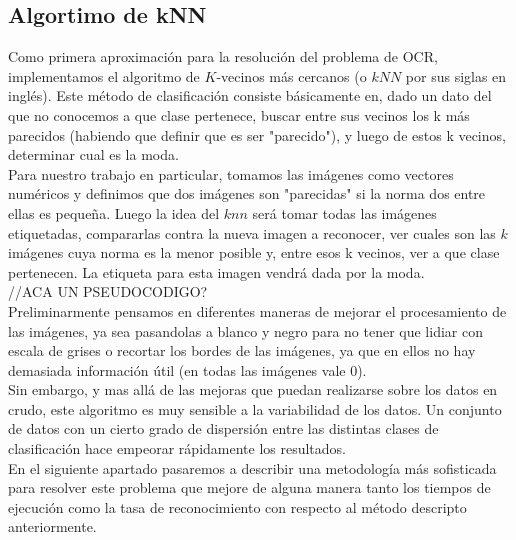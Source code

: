 \subsection{Algortimo de kNN}
Como primera aproximación para la resolución del problema de OCR, implementamos el algoritmo de $K$-vecinos más cercanos (o $kNN$ por sus siglas en inglés). Este método de clasificación consiste básicamente en, dado un dato del que no conocemos a que clase pertenece, buscar entre sus vecinos los k más parecidos (habiendo que definir que es ser "parecido"), y luego de estos k vecinos, determinar cual es la moda. 
\\
Para nuestro trabajo en particular, tomamos las imágenes como vectores numéricos y definimos que dos imágenes son "parecidas" si la norma dos entre ellas es pequeña. Luego la idea del $knn$ será tomar todas las imágenes etiquetadas, compararlas contra la nueva imagen a reconocer, ver cuales son las $k$ imágenes cuya norma es la menor posible y, entre esos k vecinos, ver a que clase pertenecen. La etiqueta para esta imagen vendrá dada por la moda. 
\\
//ACA UN PSEUDOCODIGO?
\\
Preliminarmente pensamos en diferentes maneras de mejorar el procesamiento de las imágenes, ya sea pasandolas a blanco y negro para no tener que lidiar con escala de grises o recortar los bordes de las imágenes, ya que en ellos no hay demasiada información útil (en todas las imágenes vale 0).
\\
Sin embargo, y mas allá de las mejoras que puedan realizarse sobre los datos en crudo, este algoritmo es muy sensible a la variabilidad de los datos. Un conjunto de datos con un cierto grado de dispersión entre las distintas clases de clasificación hace empeorar rápidamente los resultados.
\\
En el siguiente apartado pasaremos a describir una metodología más sofisticada para resolver este problema que mejore de alguna manera tanto los tiempos de ejecución como la tasa de reconocimiento con respecto al método descripto anteriormente.

